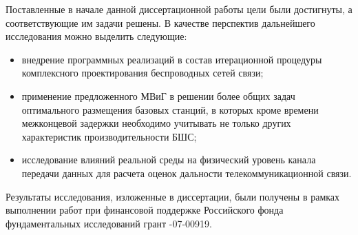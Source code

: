 Поставленные в начале данной диссертационной работы цели были достигнуты, а соответствующие им задачи решены. В качестве перспектив дальнейшего исследования можно выделить следующие:
\begin{itemize}
    \item внедрение программных реализаций в состав итерационной процедуры комплексного проектирования беспроводных сетей связи;
    \item  применение предложенного МВиГ в решении более общих   задач оптимального размещения базовых станций, в которых кроме времени межконцевой задержки необходимо учитывать не только  других характеристик производительности БШС;
    \item исследование влияний реальной среды на физический уровень канала передачи данных для расчета оценок дальности телекоммуникационной связи.
    
\end{itemize}

Результаты исследования, изложенные в диссертации, были получены в рамках выполнении работ при финансовой поддержке Российского фонда фундаментальных исследований грант -07-00919.



% 

